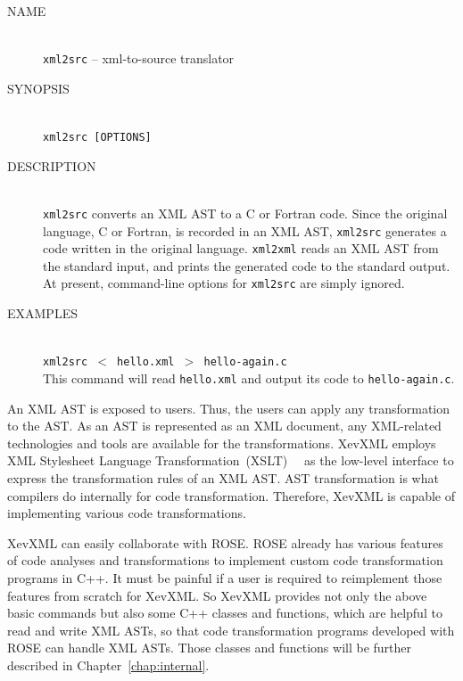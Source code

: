 \begin{framed}
\begin{description}
 \item[NAME]~\\
	    \texttt{xml2src} -- xml-to-source translator

 \item[SYNOPSIS]~\\
	    \texttt{xml2src [OPTIONS]}

 \item[DESCRIPTION]~\\ \texttt{xml2src} converts an XML AST to a C or
	    Fortran code. Since the original language, C or Fortran, is
	    recorded in an XML AST, \texttt{xml2src} generates a code
	    written in the original language. \texttt{xml2xml} reads an
	    XML AST from the standard input, and prints the generated
	    code to the standard output. At present, command-line
	    options for \texttt{xml2src} are simply ignored.

 \item[EXAMPLES]~\\ \texttt{xml2src $<$ hello.xml $>$ hello-again.c}\\
	    This command will read \texttt{hello.xml} and output its
	    code to \texttt{hello-again.c}.
\end{description}
\end{framed}

An XML AST is exposed to users. Thus, the users can apply any
transformation to the AST. As an AST is represented as an XML
document, any XML-related technologies and tools are available for the
transformations. XevXML employs XML Stylesheet Language
Transformation~(XSLT)~\cite{Kay08xslt}~\cite{Tidwell08xslt} as the
low-level interface to express the transformation rules of an XML AST.
AST transformation is what compilers do internally for code
transformation. Therefore, XevXML is capable of implementing various
code transformations.

XevXML can easily collaborate with ROSE.  ROSE already has various
features of code analyses and transformations to implement custom code
transformation programs in C++.  It must be painful if a user is
required to reimplement those features from scratch for XevXML. So
XevXML provides not only the above basic commands but also some C++
classes and functions, which are helpful to read and write XML ASTs, so
that code transformation programs developed with ROSE can handle XML
ASTs. Those classes and functions will be further described in
Chapter~\ref{chap:internal}.

